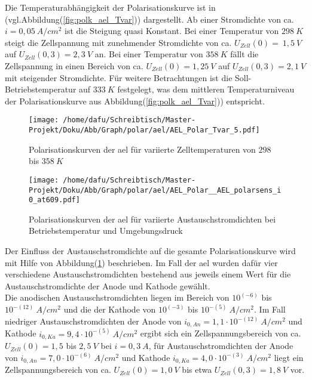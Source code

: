\documentclass[onecolumn,10pt,titlepage]{article}
\begin{document}
Die Temperaturabhängigkeit der Polarisationskurve ist in (vgl.Abbildung(\ref{fig:polk_ael_Tvar})) dargestellt. Ab einer Stromdichte von ca. $i=0,05~A/cm^2$ ist die Steigung quasi Konstant. Bei einer Temperatur von $298~K$ steigt die Zellspannung mit zunehmender Stromdichte von ca. $U_{Zell}(0)=~1,5~V$ auf $U_{Zell}(0,3)=2,3~V$ an. Bei einer Temperatur von $358~K$ fällt die Zellspannung in einen Bereich von ca. $U_{Zell}(0)=1,25~V$ auf $U_{Zell}(0,3)=2,1~V$ mit steigender Stromdichte.
Für weitere Betrachtungen ist die Soll-Betriebstemperatur auf $333~K$ festgelegt, was dem mittleren Temperaturniveau der Polarisationskurve aus Abbildung(\ref{fig:polk_ael_Tvar})) entspricht.
\begin{figure}[H]
	\centering
	\begin{minipage}[t]{0.49\textwidth}
		\texttt{[image: /home/dafu/Schreibtisch/Master-Projekt/Doku/Abb/Graph/polar/ael/AEL\_Polar\_Tvar\_5.pdf]}
		
		\caption[Polarisationskurven der \gls{ael} für variierte Zelltemperaturen]{Polarisationskurven der \gls{ael} für variierte Zelltemperaturen von $298$ bis $358~K$}
		\label{fig:polk_ael_Tvar} 
	\end{minipage}
	\hfill
	\begin{minipage}[t]{0.49\textwidth}
		\texttt{[image: /home/dafu/Schreibtisch/Master-Projekt/Doku/Abb/Graph/polar/ael/AEL\_Polar\_\_AEL\_polarsens\_i0\_at609.pdf]}
		
		\caption[Polarisationskurven der \gls{ael} für variierte Austauschstromdichten]{Polarisationskurven der \gls{ael} für variierte Austauschstromdichten bei Betriebstemperatur und Umgebungsdruck}
		\label{fig:polk_ael_i0var}  
	\end{minipage}
\end{figure}
Der Einfluss der Austauschstromdichte auf die gesamte Polarisationskurve wird mit Hilfe von Abbildung(\ref{fig:polk_ael_i0var}) beschrieben. Im Fall der \gls{ael} wurden dafür vier verschiedene Austauschstromdichten bestehend aus jeweils einem Wert für die Austauschstromdichte der Anode und Kathode gewählt.\\ Die anodischen Austauschstromdichten liegen im Bereich von $10^{(-6)}$ bis $10^{-(12)}~A/cm^2$ und die der Kathode von $10^{(-3)}$ bis $10^{-(5)}~A/cm^2$. Im Fall niedriger Austauschstromdichten der Anode von $i_{0,An}=1,1 \cdot10^{-(12)}~A/cm^2$ und Kathode $i_{0,Ka}=9,4 \cdot10^{-(5)}~A/cm^2$ ergibt sich ein Zellspannungsbereich von ca. $U_{Zell}(0)=1,5$ bis $2,5~V$ bei $i=0,3~A$, für Austauschstromdichten der Anode von $i_{0,An}=7,0 \cdot10^{-(6)}~A/cm^2$ und Kathode $i_{0,Ka}=4,0 \cdot10^{-(3)}~A/cm^2$ liegt ein Zellspannungsbereich von ca. $U_{Zell}(0)=1,0~V$ bis etwa $U_{Zell}(0,3)=1,8~V$ vor.
\end{document}
